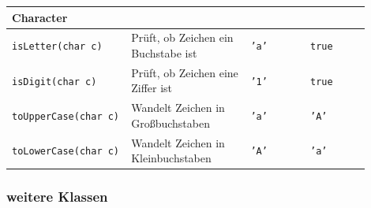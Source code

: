 \documentclass[a4paper,10pt, dvipsnames]{report}
\newcommand{\javaInLine}[1]{\texttt{#1}}
\begin{document}
\begin{longtable}{|p{0.3\linewidth}|p{0.3\linewidth}|p{0.15\linewidth}|p{0.15\linewidth}|}
\multicolumn{4}{|l|}{\textbf{Character}} \\
\hline
\javaInLine{isLetter(char c)} & Prüft, ob Zeichen ein Buchstabe ist & \javaInLine{'a'} & \javaInLine{true} \\
\javaInLine{isDigit(char c)} & Prüft, ob Zeichen eine Ziffer ist & \javaInLine{'1'} & \javaInLine{true} \\
\javaInLine{toUpperCase(char c)} & Wandelt Zeichen in Großbuchstaben & \javaInLine{'a'} & \javaInLine{'A'} \\
\javaInLine{toLowerCase(char c)} & Wandelt Zeichen in Kleinbuchstaben & \javaInLine{'A'} & \javaInLine{'a'} \\
\hline

\end{longtable}

\normalsize


\subsubsection{weitere Klassen}

\small
\end{document}
